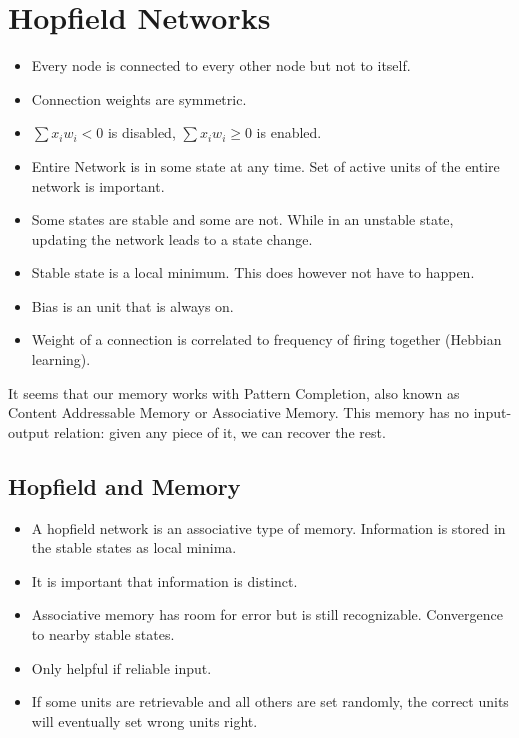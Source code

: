 \documentclass[main]{subfiles}
\begin{document}

\section{Hopfield Networks}

\begin{itemize}[noitemsep,nolistsep]
	\item Every node is connected to every other node but not to itself.
	\item Connection weights are symmetric.
	\item $\sum x_i w_i < 0$ is disabled, $\sum x_i w_i \geq 0$ is enabled.
	\item Entire Network is in some state at any time. Set of active units of the entire network is important.
	\item Some states are stable and some are not. While in an unstable state, updating the network leads to a state change.
	\item Stable state is a local minimum. This does however not have to happen.
	\item Bias is an unit that is always on.
	\item Weight of a connection is correlated to frequency of firing together (Hebbian learning).
\end{itemize}

It seems that our memory works with Pattern Completion, also known as Content Addressable Memory or Associative Memory.
This memory has no input-output relation: given any piece of it, we can recover the rest.

\subsection{Hopfield and Memory}
\begin{itemize}[noitemsep,nolistsep]
	\item A hopfield network is an associative type of memory. Information is stored in the stable states as local minima.
	\item It is important that information is distinct.
	\item Associative memory has room for error but is still recognizable. Convergence to nearby stable states.
	\item Only helpful if reliable input.
	\item If some units are retrievable and all others are set randomly, the correct units will eventually set wrong units right.
\end{itemize}
\end{document}
